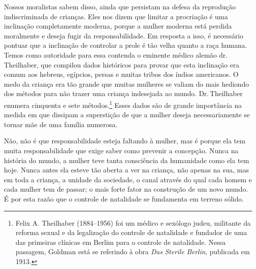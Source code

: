 Nossos moralistas sabem disso, ainda que persistam na defesa da
reprodução indiscriminada de crianças. Eles nos dizem que limitar a
procriação é uma inclinação completamente moderna, porque a mulher
moderna está perdida moralmente e deseja fugir da responsabilidade. Em
resposta a isso, é necessário pontuar que a inclinação de controlar a
prole é tão velha quanto a raça humana. Temos como autoridade para essa
contenda o eminente médico alemão dr.\,Theilhaber, que compilou dados
históricos para provar que esta inclinação era comum aos hebreus,
egípcios, persas e muitas tribos dos índios americanos. O medo da
criança era tão grande que muitas mulheres se valiam do mais hediondo
dos métodos para não trazer uma criança indesejada ao mundo. Dr.\,Theilhaber enumera cinquenta e sete métodos.\footnote{Felix A.
  Theilhaber (1884--1956) foi um médico e sexólogo judeu, militante da
  reforma sexual e da legalização do controle de natalidade e fundador
  de uma das primeiras clínicas em Berlim para o controle de natalidade.
  Nessa passagem, Goldman está se referindo à obra \emph{Das Sterile
  Berlin}, publicada em 1913.} Esses dados são de grande importância na
medida em que dissipam a superstição de que a mulher deseja necessariamente se tornar mãe
de uma família numerosa.

Não, não é que responsabilidade esteja faltando à mulher, mas é porque
ela tem muita responsabilidade que exige saber como prevenir a
concepção. Nunca na história do mundo, a mulher teve tanta consciência
da humanidade como ela tem hoje. Nunca antes ela esteve tão aberta a ver
na criança, não apenas na sua, mas em toda a criança, a unidade da
sociedade, o canal através do qual cada homem e cada mulher tem de
passar; o mais forte fator na construção de um novo mundo. É por esta
razão que o controle de natalidade se fundamenta em terreno sólido.

